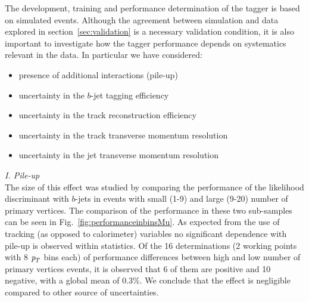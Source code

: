 The development, training and performance determination of the tagger is based on simulated events. Although the agreement between simulation and data explored in section~\ref{sec:validation} is a necessary validation condition, it is also important to investigate how the tagger performance depends on systematics relevant in the data. In particular we have considered:
%
%
\begin{itemize}\addtolength{\itemsep}{-0.4\baselineskip}
\item
presence of additional interactions (pile-up)
\item
uncertainty in the $b$-jet tagging efficiency %
\item
uncertainty in the track reconstruction efficiency
\item
uncertainty in the track transverse momentum resolution
\item
uncertainty in the jet transverse momentum resolution  
\end{itemize}

{ \em I. Pile-up}
\\[3mm]
  The size of this effect was studied by comparing the performance of the likelihood discriminant with $b$-jets in events with small (1-9) and large (9-20) number of primary vertices. 
The comparison of the performance in these two sub-samples can be seen in Fig.~\ref{fig:performanceinbinsMu}. 
As expected from the use of tracking (as opposed to calorimeter) variables no significant dependence with pile-up is observed within statistics. Of the 16 determinations (2 working points with 8 ${\emph{p}_{T}}$ bins each) of performance differences between high and low number of primary vertices events, it is observed that 6 of them are positive and 10 negative, with a global mean of 0.3\%. We conclude that the effect is negligible compared to other source of uncertainties.
%

